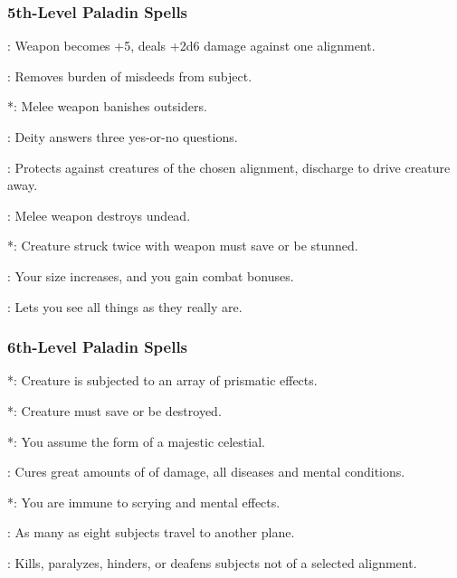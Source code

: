 \subsubsection{5th-Level Paladin Spells}
\begin{list}{}{\leftmargin=1em}
 \item {}: Weapon becomes +5, deals +2d6 damage against one alignment.
 \item {}: Removes burden of misdeeds from subject.
 \item {}*: Melee weapon banishes outsiders.
 \item {}: Deity answers three yes-or-no questions.
 \item {}: Protects against creatures of the chosen alignment, discharge to drive creature away.
 \item {}: Melee weapon destroys undead.
 \item {}*: Creature struck twice with weapon must save or be stunned.
 \item {}: Your size increases, and you gain combat bonuses.
 \item {}: Lets you see all things as they really are.
\end{list}
\subsubsection{6th-Level Paladin Spells}
\begin{list}{}{\leftmargin=1em}
 \item {}*: Creature is subjected to an array of prismatic effects.
 \item {}*: Creature must save or be destroyed.
 \item {}*: You assume the form of a majestic celestial.
 \item {}: Cures great amounts of of damage, all diseases and mental conditions.
 \item {}*: You are immune to scrying and mental effects.
 \item {}: As many as eight subjects travel to another plane.
 \item {}: Kills, paralyzes, hinders, or deafens subjects not of a selected alignment.
\end{list}
